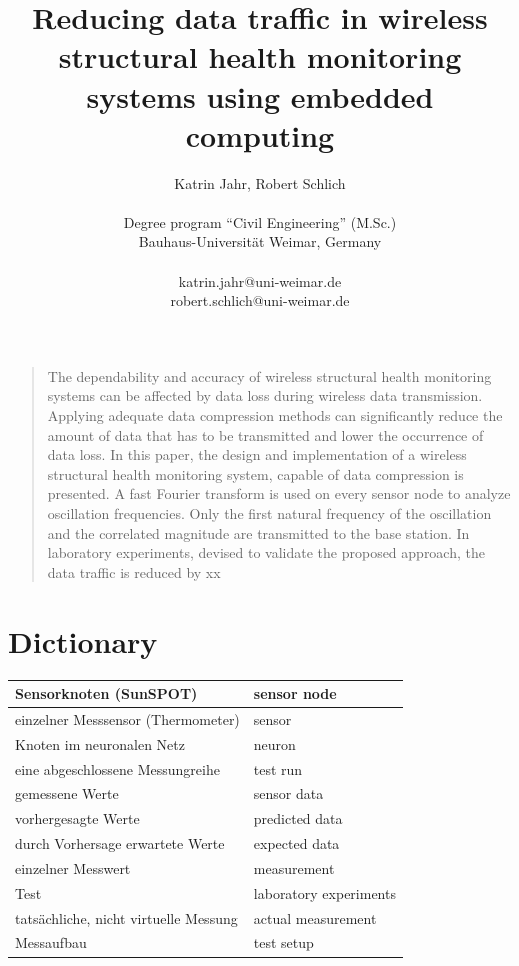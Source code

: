 \documentclass[12pt,a4paper]{scrartcl}
\title{\textbf{ \Large{Reducing data traffic in wireless structural health monitoring systems using embedded computing}}}
\author
{Katrin Jahr, Robert Schlich\\
\\
\normalsize{Degree program “Civil Engineering” (M.Sc.)}\\
\normalsize{Bauhaus-Universität Weimar, Germany}\\
\\
\normalsize{katrin.jahr@uni-weimar.de}\\
\normalsize{robert.schlich@uni-weimar.de}
}
\date{}
\newenvironment{sciabstract}{%
\begin{quote} \bfseries}
{\end{quote}}
\begin{document}
 


\baselineskip20pt


\maketitle 

% 
\setlength{\emergencystretch}{3pt}

\begin{sciabstract}

The dependability and accuracy of wireless structural health monitoring systems can be affected by data loss during wireless data transmission.
Applying adequate data compression methods can significantly reduce the amount of data that has to be transmitted and lower the occurrence of data loss.
In this paper, the design and implementation of a wireless structural health monitoring system, capable of data compression is presented. 
A fast Fourier transform is used on every sensor node to analyze oscillation frequencies. 
Only the first natural frequency of the oscillation and the correlated magnitude are transmitted to the base station.
In laboratory experiments, devised to validate the proposed approach, the data traffic is reduced by xx %

\end{sciabstract}


\linenumbers %
\modulolinenumbers[5] %

\section*{Dictionary}

\begin{tabular}{|l|l|}
\hline 
Sensorknoten (SunSPOT) & sensor node \\ 
\hline 
einzelner Messsensor (Thermometer) & sensor \\ 
\hline 
Knoten im neuronalen Netz & neuron \\ 
\hline 
eine abgeschlossene Messungreihe & test run \\ 
\hline 
gemessene Werte & sensor data \\ 
\hline 
vorhergesagte Werte & predicted data \\ 
\hline 
durch Vorhersage erwartete Werte & expected data \\ 
\hline 
einzelner Messwert & measurement \\ 
\hline 
Test & laboratory experiments\\ 
\hline
tatsächliche, nicht virtuelle Messung & actual measurement \\
\hline
Messaufbau & test setup \\
\hline
\end{tabular} 
\end{document}
